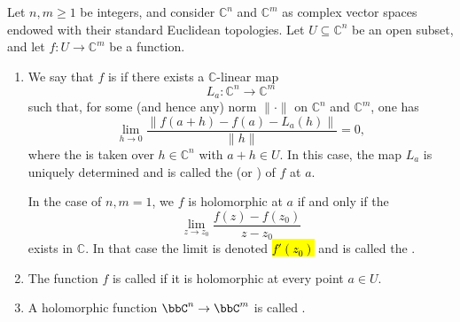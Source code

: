 \begin{definition} \label{definition:holomorphic_function_from_a_subset_of_Cn_to_Cm_and_derivative_of_a_holomorphic_function_at_a_point}
Let $n,m \geq 1$ be integers, and consider $\mathbb{C}^n$ and $\mathbb{C}^m$ as complex vector spaces endowed with their standard Euclidean topologies. Let $U \subseteq \mathbb{C}^n$ be an open subset, and let $f : U \to \mathbb{C}^m$ be a function.
  \begin{enumerate}
    \item We say that $f$ is  if there exists a $\mathbb{C}$-linear map
    $$ L_a : \mathbb{C}^n \to \mathbb{C}^m $$
    such that, for some (and hence any) norm $\|\cdot\|$ on $\mathbb{C}^n$ and $\mathbb{C}^m$, one has
    $$ \lim_{h \to 0} \frac{\| f(a+h) - f(a) - L_a(h) \|}{\|h\|} = 0, $$
    where the  is taken over $h \in \mathbb{C}^n$ with $a+h \in U$.
    In this case, the map $L_a$ is uniquely determined and is called the  (or ) of $f$ at $a$. 

    In the case of $n,m = 1$, we $f$ is holomorphic at $a$ if and only if the 
    $$\lim_{z \to z_0} \frac{f(z) - f(z_0)}{z - z_0}$$
    exists in $\mathbb{C}$. In that case the limit is denoted \hl{$f'(z_0)$} and is called the .
    

    \item The function $f$ is called  if it is holomorphic at every point $a \in U$.

    \item A holomorphic function $\bbC^n \to \bbC^m$ is called .

  \end{enumerate}
\end{definition}